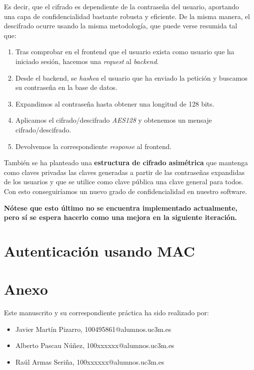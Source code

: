 \documentclass[a4paper,11pt]{article}
\begin{document}
Es decir, que el cifrado es dependiente de la contraseña del usuario, aportando una capa de confidencialidad bastante robusta y eficiente. De la misma manera, el descifrado ocurre usando la misma metodología, que puede verse resumida tal que:
\begin{enumerate}
    \item Tras comprobar en el frontend que el usuario exista como usuario que ha iniciado sesión, hacemos una \textit{request} al \textit{backend}.
    \item Desde el backend, se \textit{hashea} el usuario que ha enviado la petición y buscamos su contraseña en la base de datos.
    \item Expandimos al contraseña hasta obtener una longitud de 128 bits.
    \item Aplicamos el cifrado/descifrado \textit{AES128} y obtenemos un mensaje cifrado/descifrado.
    \item Devolvemos la correspondiente \textit{response} al frontend.
\end{enumerate}

También se ha planteado una \textbf{estructura de cifrado asimétrica} que mantenga como claves privadas las claves generadas a partir de las contraseñas expandidas de los usuarios y que se utilice como clave pública una clave general para todos. Con esto conseguiríamos un nuevo grado de confidencialidad en nuestro software. 

\textbf{Nótese que esto último no se encuentra implementado actualmente, pero sí se espera hacerlo como una mejora en la siguiente iteración.}

\section{Autenticación usando MAC}

\section{Anexo}
Este manuscrito y su correspondiente práctica ha sido realizado por:
\begin{itemize}
    \item Javier Martín Pizarro, 100495861@alumnos.uc3m.es
    \item Alberto Pascau Núñez, 100xxxxxx@alumnos.uc3m.es
    \item Raúl Armas Seriña, 100xxxxxx@alumnos.uc3m.es
\end{itemize}
\end{document}
